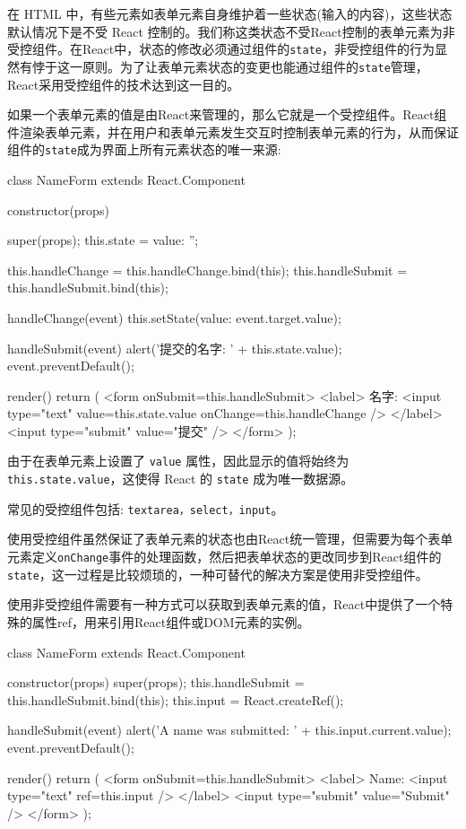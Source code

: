 在 HTML 中，有些元素如表单元素自身维护着一些状态(输入的内容)，这些状态默认情况下是不受 React 控制的。我们称这类状态不受React控制的表单元素为非受控组件。在React中，状态的修改必须通过组件的\texttt{state}，非受控组件的行为显然有悖于这一原则。为了让表单元素状态的变更也能通过组件的\texttt{state}管理，React采用受控组件的技术达到这一目的。

如果一个表单元素的值是由React来管理的，那么它就是一个受控组件。React组件渲染表单元素，并在用户和表单元素发生交互时控制表单元素的行为，从而保证组件的\texttt{state}成为界面上所有元素状态的唯一来源:

\begin{JavaScript}
class NameForm extends React.Component {
  constructor(props) {
    super(props);
    this.state = {value: ''};

    this.handleChange = this.handleChange.bind(this);
    this.handleSubmit = this.handleSubmit.bind(this);
  }

  handleChange(event) {
    this.setState({value: event.target.value});
  }

  handleSubmit(event) {
    alert('提交的名字: ' + this.state.value);
    event.preventDefault();
  }

  render() {
    return (
      <form onSubmit={this.handleSubmit}>
        <label>
          名字:
          <input type="text" value={this.state.value} onChange={this.handleChange} />
        </label>
        <input type="submit" value="提交" />
      </form>
    );
  }
}
\end{JavaScript}

由于在表单元素上设置了 \texttt{value} 属性，因此显示的值将始终为 \texttt{this.state.value}，这使得 React 的 \texttt{state} 成为唯一数据源。

常见的受控组件包括: \texttt{textarea，select，input}。

使用受控组件虽然保证了表单元素的状态也由React统一管理，但需要为每个表单元素定义\texttt{onChange}事件的处理函数，然后把表单状态的更改同步到React组件的\texttt{state}，这一过程是比较烦琐的，一种可替代的解决方案是使用非受控组件。

使用非受控组件需要有一种方式可以获取到表单元素的值，React中提供了一个特殊的属性ref，用来引用React组件或DOM元素的实例。

\begin{JavaScript}
class NameForm extends React.Component {
  constructor(props) {
    super(props);
    this.handleSubmit = this.handleSubmit.bind(this);
    this.input = React.createRef();
  }

  handleSubmit(event) {
    alert('A name was submitted: ' + this.input.current.value);
    event.preventDefault();
  }

  render() {
    return (
      <form onSubmit={this.handleSubmit}>
        <label>
          Name:
          <input type="text" ref={this.input} />
        </label>
        <input type="submit" value="Submit" />
      </form>
    );
  }
}
\end{JavaScript}

